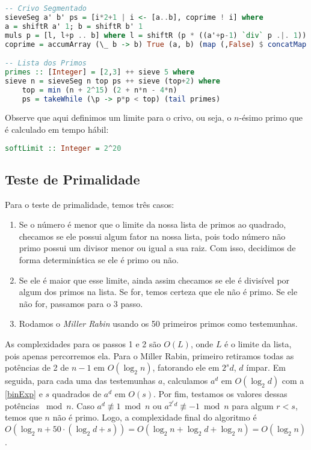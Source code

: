 \documentclass{article}
\begin{document}
\begin{minipage}{0.9\linewidth}
\begin{lstlisting}[language=haskell,caption=Crivo de Eratóstenes e Lista dos primos]
-- Crivo Segmentado
sieveSeg a' b' ps = [i*2+1 | i <- [a..b], coprime ! i] where
a = shiftR a' 1; b = shiftR b' 1
muls p = [l, l+p .. b] where l = shiftR (p * ((a'+p-1) `div` p .|. 1)) 1
coprime = accumArray (\_ b -> b) True (a, b) (map (,False) $ concatMap muls ps) :: UArray Integer Bool

-- Lista dos Primos
primes :: [Integer] = [2,3] ++ sieve 5 where
sieve n = sieveSeg n top ps ++ sieve (top+2) where
    top = min (n + 2^15) (2 + n*n - 4*n)
    ps = takeWhile (\p -> p*p < top) (tail primes)
\end{lstlisting}
\end{minipage}

Observe que aqui definimos um limite para o crivo, ou seja, o $n$-ésimo primo que é calculado em tempo hábil:

\begin{minipage}{0.9\linewidth}
\begin{lstlisting}[language=haskell,caption=Limite do Crivo]
softLimit :: Integer = 2^20
\end{lstlisting}
\end{minipage}

\subsection{Teste de Primalidade}
\label{isPrime}

Para o teste de primalidade, temos três casos:

\begin{enumerate}
\item Se o número é menor que o limite da nossa lista de primos ao quadrado, checamos se ele possui algum fator na nossa lista, pois todo número não primo possui um divisor menor ou igual a sua raiz. Com isso, decidimos de forma determinística se ele é primo ou não.
\item Se ele é maior que esse limite, ainda assim checamos se ele é divisível por algum dos primos na lista. Se for, temos certeza que ele não é primo. Se ele não for, passamos para o 3 passo.
\item Rodamos o \textit{Miller Rabin} usando os 50 primeiros primos como testemunhas.
\end{enumerate}

As complexidades para os passos 1 e 2 são $O(L)$, onde $L$ é o limite da lista, pois apenas percorremos ela. Para o Miller Rabin, primeiro retiramos todas as potências de 2 de $n - 1$ em $O(\log_2 n)$, fatorando ele em $2^sd$, $d$ ímpar. Em seguida, para cada uma das testemunhas $a$, calculamos $a^d$ em $O(\log_2 d)$ com a \ref{binExp} e $s$ quadrados de $a^d$ em $O(s)$. Por fim, testamos os valores dessas potências $\bmod n$. Caso $a^d \not\equiv 1 \bmod n$ ou $a^{2^rd} \not\equiv -1 \bmod n$ para algum $r < s$, temos que $n$ não é primo. Logo, a complexidade final do algoritmo é $O(\log_2 n + 50 \cdot (\log_2 d + s)) = O(\log_2n + \log_2 d + \log_2 n) = O(\log_2 n)$.
\end{document}
